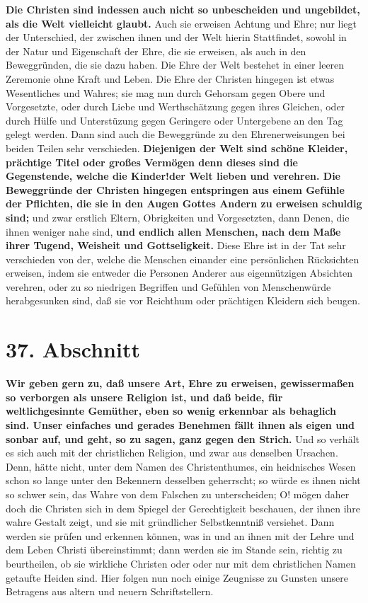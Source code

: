 \textbf{Die Christen sind indessen auch nicht so unbescheiden und ungebildet,
als die
Welt vielleicht glaubt.} Auch sie erweisen Achtung und Ehre; nur liegt der
Unterschied, der zwischen ihnen und der Welt hierin Stattfindet, sowohl in der
Natur und Eigenschaft der Ehre, die sie erweisen, als auch in den Beweggründen,
die sie dazu haben. Die Ehre der Welt bestehet in einer leeren Zeremonie ohne
Kraft und Leben. Die Ehre der Christen hingegen ist etwas Wesentliches und
Wahres; sie mag nun durch Gehorsam gegen Obere und Vorgesetzte, oder durch Liebe
und Werthschätzung gegen ihres Gleichen, oder durch Hülfe und Unterstüzung gegen
Geringere oder Untergebene an den Tag gelegt werden. Dann sind auch die
Beweggründe zu den Ehrenerweisungen bei beiden Teilen sehr verschieden.
\textbf{Diejenigen der Welt sind schöne Kleider, prächtige Titel oder großes
Vermögen
denn dieses sind die Gegenstende, welche die Kinder!der Welt lieben und
verehren. Die Beweggründe der Christen hingegen entspringen aus einem Gefühle
der Pflichten, die sie in den Augen Gottes Andern zu erweisen schuldig sind;}
und
zwar erstlich Eltern, Obrigkeiten und Vorgesetzten, dann Denen, die ihnen
weniger nahe sind, \textbf{und endlich allen Menschen, nach dem Maße ihrer
Tugend,
Weisheit und Gottseligkeit.} Diese Ehre ist in der Tat sehr verschieden von der,
welche die Menschen einander eine persönlichen Rücksichten erweisen, indem sie
entweder die Personen Anderer aus eigennützigen Absichten verehren, oder zu so
niedrigen Begriffen und Gefühlen von Menschenwürde herabgesunken sind, daß sie
vor Reichthum oder prächtigen Kleidern sich beugen.

\section{37. Abschnitt} \label{kap9_ab37}

\textbf{Wir geben gern zu, daß unsere Art, Ehre zu erweisen, gewissermaßen so
verborgen
als unsere Religion ist, und daß beide, für weltlichgesinnte Gemüther, eben so
wenig erkennbar als behaglich sind. Unser einfaches und gerades Benehmen fällt
ihnen als eigen und sonbar auf, und geht, so zu sagen, ganz gegen den Strich.}
Und so verhält es sich auch mit der christlichen Religion, und zwar aus
denselben Ursachen. Denn, hätte nicht, unter dem Namen des Christenthumes, ein
heidnisches Wesen schon so lange unter den Bekennern desselben geherrscht; so
würde es ihnen nicht so schwer sein, das Wahre von dem Falschen zu
unterscheiden; O! mögen daher doch die Christen sich in dem Spiegel der
Gerechtigkeit beschauen, der ihnen ihre wahre Gestalt zeigt, und sie mit
gründlicher Selbstkenntniß versiehet. Dann werden sie prüfen und erkennen
können, was in und an ihnen mit der Lehre und dem Leben Christi übereinstimmt;
dann werden sie im Stande sein, richtig zu beurtheilen, ob sie wirkliche
Christen oder oder nur mit dem christlichen Namen getaufte Heiden  sind. Hier
folgen nun noch einige Zeugnisse zu Gunsten unsere Betragens aus altern und
neuern Schriftstellern.


